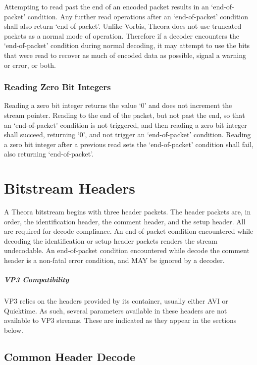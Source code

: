 \documentclass[11pt,letterpaper]{book}
\numberwithin{equation}{chapter}
\numberwithin{figure}{chapter}
\numberwithin{table}{chapter}
\begin{document}
Attempting to read past the end of an encoded packet results in an
 `end-of-packet' condition.
Any further read operations after an `end-of-packet' condition shall also
 return `end-of-packet'.
Unlike Vorbis, Theora does not use truncated packets as a normal mode of
 operation.
Therefore if a decoder encounters the `end-of-packet' condition during normal
 decoding, it may attempt to use the bits that were read to recover as much of
 encoded data as possible, signal a warning or error, or both.

\subsection{Reading Zero Bit Integers}

Reading a zero bit integer returns the value `$0$' and does not increment
 the stream pointer.
Reading to the end of the packet, but not past the end, so that an
 `end-of-packet' condition is not triggered, and then reading a zero bit
 integer shall succeed, returning `$0$', and not trigger an `end-of-packet'
 condition.
Reading a zero bit integer after a previous read sets the `end-of-packet'
 condition shall fail, also returning `end-of-packet'.

\chapter{Bitstream Headers}
\label{sec:headers}

A Theora bitstream begins with three header packets.
The header packets are, in order, the identification header, the comment
 header, and the setup header.
All are required for decode compliance.
An end-of-packet condition encountered while decoding the identification or
 setup header packets renders the stream undecodable.
An end-of-packet condition encountered while decode the comment header is a
 non-fatal error condition, and MAY be ignored by a decoder.

\paragraph{VP3 Compatibility}

VP3 relies on the headers provided by its container, usually either AVI or
 Quicktime.
As such, several parameters available in these headers are not available to VP3
 streams.
These are indicated as they appear in the sections below.

\section{Common Header Decode}
\label{sub:common-header}
\end{document}
